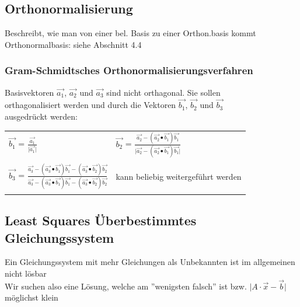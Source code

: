 		 
			
			\subsection{Orthonormalisierung}
			Beschreibt, wie man von einer bel. Basis zu einer Orthon.basis kommt \\		
			Orthonormalbasis: siehe Abschnitt 4.4
			
			
			\subsubsection{Gram-Schmidtsches Orthonormalisierungsverfahren}
			Basisvektoren $\vec{a_1}$, $\vec{a_2}$ und $\vec{a_3}$ sind nicht orthagonal. Sie sollen \\
			orthagonalisiert werden und durch die Vektoren $\vec{b_1}$, $\vec{b_2}$ und $\vec{b_3}$ \\
			ausgedrückt werden: \\
			
			\begin{tabular}{ll}
			$\vec{b_1}$ = $\frac{\vec{a_1}}{\vert \vec{a_1} \vert}$ & $\vec{b_2}$  = $\frac{\vec{a_2} - ( \vec{a_2} \bullet \vec{b_1} ) \vec{b_1}}{\vert \vec{a_2} - ( \vec{a_2} \bullet \vec{b_1} ) \vec{b_1} \vert}$\\
		 \\
			$\vec{b_3}$ = $\frac{\vec{a_3} - ( \vec{a_3} \bullet \vec{b_1} ) \vec{b_1} - ( \vec{a_3} \bullet \vec{b_2} ) \vec{b_2}}  {\vec{a_3} - ( \vec{a_3} \bullet \vec{b_1} ) \vec{b_1} - ( \vec{a_3} \bullet \vec{b_2} ) \vec{b_2}}$  &  kann beliebig weitergeführt werden \\
			\\
			\end{tabular}

			\subsection{Least Squares Überbestimmtes Gleichungssystem}
			Ein Gleichungssystem mit mehr Gleichungen als Unbekannten ist im allgemeinen nicht lösbar \\	
			Wir suchen also eine Lösung, welche am ''wenigsten falsch'' ist bzw. $\vert A \cdot \vec{x} - \vec{b} \vert$ möglichst klein 
				
